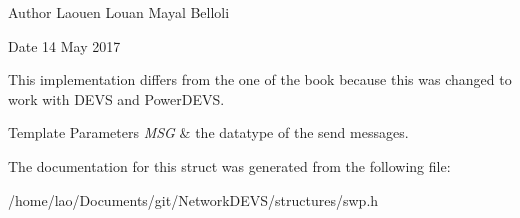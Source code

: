 \begin{DoxyAuthor}{Author}
Laouen Louan Mayal Belloli 
\end{DoxyAuthor}
\begin{DoxyDate}{Date}
14 May 2017
\end{DoxyDate}
This implementation differs from the one of the book because this was changed to work with D\+E\+VS and Power\+D\+E\+VS.


\begin{DoxyTemplParams}{Template Parameters}
{\em M\+SG} & the datatype of the send messages. \\
\hline
\end{DoxyTemplParams}


The documentation for this struct was generated from the following file\+:\begin{DoxyCompactItemize}
\item 
/home/lao/\+Documents/git/\+Network\+D\+E\+V\+S/structures/swp.\+h\end{DoxyCompactItemize}
